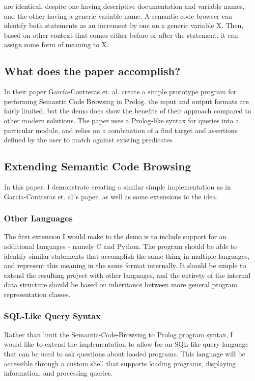 \documentclass{article}
\begin{document}
are identical, despite one having descriptive documentation and variable names, and the other having a generic variable name. A semantic code browser can identify both statements as an increment by one on a generic variable X. Then, based on other context that comes either before or after the statement, it can assign some form of meaning to X.

\subsection{What does the paper accomplish?}
In their paper García-Contreras et. al. create a simple prototype program for performing Semantic Code Browsing in Prolog. the input and output formats are fairly limited, but the demo does show the benefits of their approach compared to other modern solutions. The paper uses a Prolog-like syntax for queries into a particular module, and relies on a combination of a find target and assertions defined by the user to match against existing predicates.

\subsection{Extending Semantic Code Browsing}
In this paper, I demonstrate creating a similar simple implementation as in García-Contreras et. al.'s paper, as well as some extensions to the idea.

\subsubsection{Other Languages}
The first extension I would make to the demo is to include support for an additional languages - namely C and Python. The program should be able to identify similar statements that accomplish the same thing in multiple languages, and represent this meaning in the same format internally. It should be simple to extend the resulting project with other languages, and the entirety of the internal data structure should be based on inheritance between more general program representation classes. 

\subsubsection{SQL-Like Query Syntax}

Rather than limit the Semantic-Code-Browsing to Prolog program syntax, I would like to extend the implementation to allow for an SQL-like query language that can be used to ask questions about loaded programs. This language will be accessible through a custom shell that supports loading programs, displaying information, and processing queries.
\end{document}
